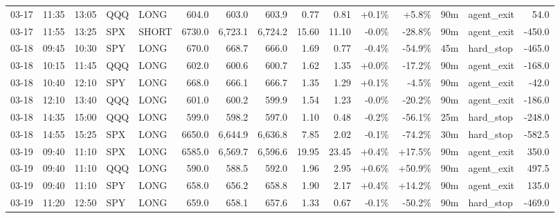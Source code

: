 \documentclass[11pt,a4paper,twoside]{article}
\begin{document}
\begin{landscape}
\begin{center}
\begin{longtable}{>{\color{txtmain}}l l l l l r r r r r r r r >{\color{txtmain}}l r}
03-17 & 11:35 & 13:05 & QQQ & LONG & 604.0 & 603.0 & 603.9 & 0.77 & 0.81 & \textcolor{wingreen}{+0.1\%} & \textcolor{wingreen}{+5.8\%} & 90m & agent\_exit & \textcolor{wingreen}{54.0} \\
03-17 & 11:55 & 13:25 & SPX & SHORT & 6730.0 & 6,723.1 & 6,724.2 & 15.60 & 11.10 & \textcolor{lossred}{-0.0\%} & \textcolor{lossred}{-28.8\%} & 90m & agent\_exit & \textcolor{lossred}{-450.0} \\
03-18 & 09:45 & 10:30 & SPY & LONG & 670.0 & 668.7 & 666.0 & 1.69 & 0.77 & \textcolor{lossred}{-0.4\%} & \textcolor{lossred}{-54.9\%} & 45m & hard\_stop & \textcolor{lossred}{-465.0} \\
03-18 & 10:15 & 11:45 & QQQ & LONG & 602.0 & 600.6 & 600.7 & 1.62 & 1.35 & \textcolor{wingreen}{+0.0\%} & \textcolor{lossred}{-17.2\%} & 90m & agent\_exit & \textcolor{lossred}{-168.0} \\
03-18 & 10:40 & 12:10 & SPY & LONG & 668.0 & 666.1 & 666.7 & 1.35 & 1.29 & \textcolor{wingreen}{+0.1\%} & \textcolor{lossred}{-4.5\%} & 90m & agent\_exit & \textcolor{lossred}{-42.0} \\
03-18 & 12:10 & 13:40 & QQQ & LONG & 601.0 & 600.2 & 599.9 & 1.54 & 1.23 & \textcolor{lossred}{-0.0\%} & \textcolor{lossred}{-20.2\%} & 90m & agent\_exit & \textcolor{lossred}{-186.0} \\
03-18 & 14:35 & 15:00 & QQQ & LONG & 599.0 & 598.2 & 597.0 & 1.10 & 0.48 & \textcolor{lossred}{-0.2\%} & \textcolor{lossred}{-56.1\%} & 25m & hard\_stop & \textcolor{lossred}{-248.0} \\
03-18 & 14:55 & 15:25 & SPX & LONG & 6650.0 & 6,644.9 & 6,636.8 & 7.85 & 2.02 & \textcolor{lossred}{-0.1\%} & \textcolor{lossred}{-74.2\%} & 30m & hard\_stop & \textcolor{lossred}{-582.5} \\
03-19 & 09:40 & 11:10 & SPX & LONG & 6585.0 & 6,569.7 & 6,596.6 & 19.95 & 23.45 & \textcolor{wingreen}{+0.4\%} & \textcolor{wingreen}{+17.5\%} & 90m & agent\_exit & \textcolor{wingreen}{350.0} \\
03-19 & 09:40 & 11:10 & QQQ & LONG & 590.0 & 588.5 & 592.0 & 1.96 & 2.95 & \textcolor{wingreen}{+0.6\%} & \textcolor{wingreen}{+50.9\%} & 90m & agent\_exit & \textcolor{wingreen}{497.5} \\
03-19 & 09:40 & 11:10 & SPY & LONG & 658.0 & 656.2 & 658.8 & 1.90 & 2.17 & \textcolor{wingreen}{+0.4\%} & \textcolor{wingreen}{+14.2\%} & 90m & agent\_exit & \textcolor{wingreen}{135.0} \\
03-19 & 11:20 & 12:50 & SPY & LONG & 659.0 & 658.1 & 657.6 & 1.33 & 0.67 & \textcolor{lossred}{-0.1\%} & \textcolor{lossred}{-50.2\%} & 90m & hard\_stop & \textcolor{lossred}{-469.0} \\

\end{longtable}
\end{center}
\end{landscape}
\end{document}

